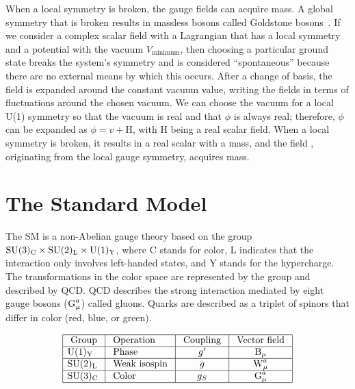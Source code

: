 When a local symmetry is broken, the gauge fields can acquire mass. A global symmetry that is broken results in massless bosons called Goldstone bosons~\cite{Goldstone:1961eq, Goldstone:1962es}. If we consider a complex scalar field with a Lagrangian that has a local \uone symmetry and a potential with the vacuum $V_{\text{minimum}}$, then choosing a particular ground state breaks the system's symmetry and is considered ``spontaneous'' because there are no external means by which this occurs. After a change of basis, the field is expanded around the constant vacuum value, writing the fields in terms of fluctuations around the chosen vacuum. We can choose the vacuum for a local U(1) symmetry so that the vacuum is real and that $\phi$ is always real; therefore, $\phi$ can be expanded as $\phi = v + \text{H}$, with H being a real scalar field. When a local \uone symmetry is broken, it results in a real scalar with a mass, and the field \amu, originating from the local gauge symmetry, acquires mass.


\section{The Standard Model}
The SM is a non-Abelian gauge theory based on the group $\text{SU}(3)_{\text{C}} \times \text{SU}(2)_{\text{L}} \times \text{U}(1)_{\text{Y}}$, where C stands for color, L indicates that the interaction only involves left-handed states, and Y stands for the hypercharge. The transformations in the color space are represented by the group \col and described by QCD. QCD describes the strong interaction mediated by eight gauge bosons ($\text{G}_{\mu}^{a}$) called gluons. Quarks are described as a triplet of spinors that differ in color (red, blue, or green).

\begin{equation}
  \begin{array}{|l|l|c|c|}
    \hline \text { Group } & \text { Operation } & \text { Coupling } & \text { Vector field } \\
    \hline \text{U}(1)_{\text{Y}} & \text { Phase } & g^{\prime} & \text{B}_{\mu} \\
    \hline \text{SU}(2)_{\text{L}} & \text { Weak isospin } & g & \text{W}_{\mu}^{a} \\
    \hline \text{SU}(3)_{\text{C}} & \text { Color } & g_{S} & \text{G}_{\mu}^{a} \\
    \hline
  \end{array}
  \label{tab:group}
\end{equation}

